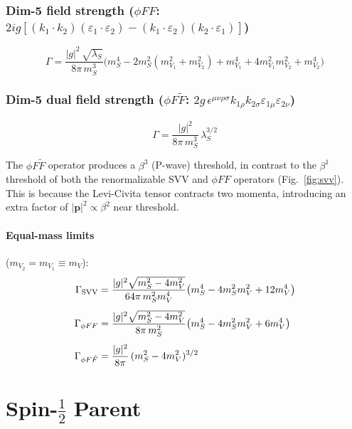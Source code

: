\documentclass[11pt,a4paper]{article}
\newcommand{\la}{\lambda}
\newcommand{\beq}{\begin{equation}}
\newcommand{\eeq}{\end{equation}}
\begin{document}
\subsubsection{Dim-5 field strength ($\phi FF$: $2ig[(k_1\cdot k_2)(\varepsilon_1\cdot\varepsilon_2) - (k_1\cdot\varepsilon_2)(k_2\cdot\varepsilon_1)]$)}
\beq
\boxed{
\Gamma = \frac{|g|^2\,\sqrt{\la_S}}{8\pi\, m_S^3}
\bigl(m_S^4 - 2m_S^2(m_{V_1}^2+m_{V_2}^2) + m_{V_1}^4+4m_{V_1}^2 m_{V_2}^2+m_{V_2}^4\bigr)
}
\label{eq:dim5FF}
\eeq

\subsubsection{Dim-5 dual field strength ($\phi F\tilde{F}$: $2g\,\epsilon^{\mu\nu\rho\sigma}k_{1\rho}k_{2\sigma}\varepsilon_{1\mu}\varepsilon_{2\nu}$)}
\beq
\boxed{
\Gamma = \frac{|g|^2}{8\pi\, m_S^3}\,\la_S^{3/2}
}
\label{eq:dim5FFdual}
\eeq

The $\phi F\tilde{F}$ operator produces a $\beta^3$ (P-wave) threshold, in contrast to the
$\beta^1$ threshold of both the renormalizable SVV and $\phi FF$ operators (Fig.~\ref{fig:svv}).
This is because the Levi-Civita tensor contracts two momenta, introducing an extra factor
of $|\mathbf{p}|^2 \propto \beta^2$ near threshold.

\paragraph{Equal-mass limits} ($m_{V_2}=m_{V_1}\equiv m_V$):
\begin{align}
\Gamma_{\rm SVV} &= \frac{|g|^2\sqrt{m_S^2-4m_V^2}}{64\pi\, m_S^2 m_V^4}
\bigl(m_S^4-4m_S^2 m_V^2+12m_V^4\bigr) \label{eq:SVV-equal}\\[4pt]
\Gamma_{\phi FF} &= \frac{|g|^2\sqrt{m_S^2-4m_V^2}}{8\pi\, m_S^2}
\bigl(m_S^4-4m_S^2 m_V^2+6m_V^4\bigr) \label{eq:FF-equal}\\[4pt]
\Gamma_{\phi F\tilde{F}} &= \frac{|g|^2}{8\pi}\,(m_S^2-4m_V^2)^{3/2}
\label{eq:FFd-equal}
\end{align}


\section{Spin-$\tfrac{1}{2}$ Parent}
\label{sec:spin12}

\end{document}
